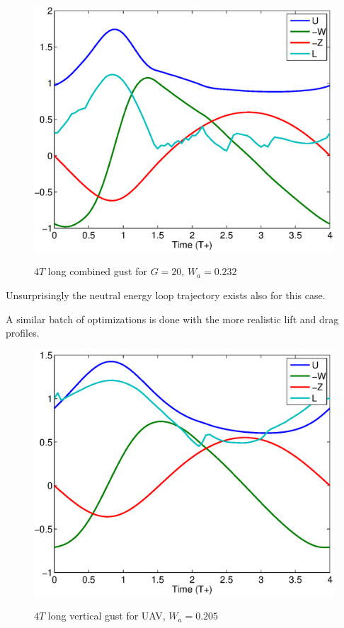\begin{figure}[h]
  \begin{center}
    \scalebox{0.8}
    {\includegraphics{./Figures/Windtype=3_Tg=4_Wg=0p232_quad_G=20.eps}}
  \end{center}
  \caption{$4T$ long combined gust for $G=20$, $W_a=0.232$}
  \label{fig:combined_optimization}
\end{figure}

Unsurprisingly the neutral energy loop trajectory exists also for this case.

\FloatBarrier


\par A similar batch of optimizations is done with the more realistic lift and drag profiles.

\begin{figure}
  \begin{center}
   \scalebox{0.8}
   {\includegraphics{./Figures/Windtype=1_Tg=4_Wg=0p205_UAV_alphamax=12.eps}}
  \end{center}
  \caption{$4T$ long vertical gust for UAV, $W_a=0.205$}
  \label{fig:vertical_optimization_UAV}
\end{figure}


